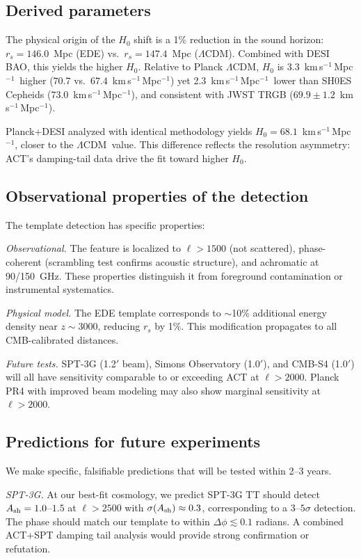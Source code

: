 \documentclass[onecolumn,showpacs,preprintnumbers,amsmath,amssymb,prd]{revtex4-2}
\newcommand{\lcdm}{$\Lambda$CDM}
\newcommand{\kms}{km\,s$^{-1}$\,Mpc$^{-1}$}
\begin{document}
\subsection{Derived parameters}

The physical origin of the $H_0$ shift is a 1\% reduction in the sound 
horizon: $r_s = 146.0$~Mpc (EDE) vs.\ $r_s = 147.4$~Mpc (\lcdm). Combined 
with DESI BAO, this yields the higher $H_0$. Relative to Planck \lcdm, $H_0$ is 3.3~\kms\ higher ($70.7$ vs.\ $67.4$~\kms) yet 2.3~\kms\ lower than SH0ES Cepheids ($73.0$~\kms), and consistent with JWST TRGB ($69.9 \pm 1.2$~\kms).

Planck+DESI analyzed with identical methodology yields $H_0 = 68.1$~\kms, 
closer to the \lcdm\ value. This difference reflects the resolution asymmetry: 
ACT's damping-tail data drive the fit toward higher $H_0$.

\subsection{Observational properties of the detection}

The template detection has specific properties:

\emph{Observational.} The feature is localized to $\ell > 1500$ (not 
scattered), phase-coherent (scrambling test confirms acoustic structure), and 
achromatic at 90/150~GHz. These properties distinguish it from 
foreground contamination or instrumental systematics.

\emph{Physical model.} The EDE template corresponds to $\sim$10\% 
additional energy density near $z \sim 3000$, reducing $r_s$ by 1\%. 
This modification propagates to all CMB-calibrated distances.

\emph{Future tests.} SPT-3G (1.2$'$ beam), Simons Observatory (1.0$'$), 
and CMB-S4 (1.0$'$) will all have sensitivity comparable to or exceeding 
ACT at $\ell > 2000$. Planck PR4 with improved beam modeling may also 
show marginal sensitivity at $\ell > 2000$.

\subsection{Predictions for future experiments}
\label{sec:predictions}

We make specific, falsifiable predictions that will be tested within 2--3 years.

\emph{SPT-3G.} At our best-fit cosmology, we predict SPT-3G TT should detect 
$A_{\rm sh} = 1.0$--$1.5$ at $\ell > 2500$ with $\sigma(A_{\rm sh}) \approx 0.3$, 
corresponding to a $3$--$5\sigma$ detection. The phase should match our 
template to within $\Delta\phi \lesssim 0.1$ radians. A combined ACT+SPT 
damping tail analysis would provide strong confirmation or refutation.
\end{document}
